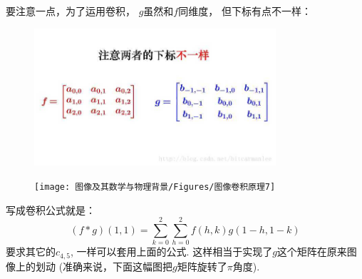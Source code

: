 要注意一点，为了运用卷积，%
$g$虽然和$f$同维度，%
但下标有点不一样：
\begin{figure}[hpbt]
  \centering
  \includegraphics[width=0.8\textwidth]{图像及其数学与物理背景/Figures/图像卷积原理6}
\end{figure}

\begin{figure}[hpbt]
  \centering
  \texttt{[image: 图像及其数学与物理背景/Figures/图像卷积原理7]}
\end{figure}

写成卷积公式就是：
\begin{equation}
  (f*g)(1,1) = \sum_{k=0}^{2}\sum_{h=0}^{2}f(h,k)g(1-h,1-k)
\end{equation}
要求其它的$c_{4,5}$,%
一样可以套用上面的公式.
这样相当于实现了$g$这个矩阵在原来图像上的划动%
(准确来说，下面这幅图把$g$矩阵旋转了$\pi$角度).%




















